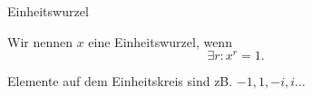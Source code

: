 \documentclass[class=article, crop=false]{standalone}
\begin{document}
\begin{zettel}{Einheitswurzel}
\begin{flashcard}[]{}
	\begin{definition}[Einheitswurzel]
		Wir nennen $x$ eine Einheitswurzel, wenn
		\[
			\exists r : x^r = 1
		.\]
	\end{definition}
	\begin{example}[Einheitswurzeln]
		Elemente auf dem Einheitskreis sind zB. $-1,1,-i,i \dots$
	\end{example}

\end{flashcard}
\end{zettel}
\end{document}
